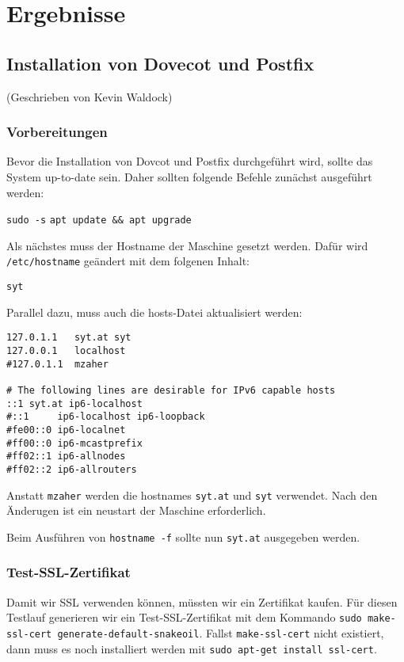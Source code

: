 
\section{Ergebnisse}
\label{sec:Ergebnisse}

\subsection{Installation von Dovecot und Postfix}
(Geschrieben von Kevin Waldock)

\subsubsection{Vorbereitungen}
Bevor die Installation von Dovcot und Postfix durchgeführt wird, sollte das System up-to-date sein.
Daher sollten folgende Befehle zunächst ausgeführt werden:

\verb|sudo -s|\newline
\verb|apt update && apt upgrade|

Als nächstes muss der Hostname der Maschine gesetzt werden. Dafür wird \verb|/etc/hostname| geändert mit dem folgenen Inhalt:

\verb|syt|

Parallel dazu, muss auch die hosts-Datei aktualisiert werden:
\begin{lstlisting}[escapechar=@]
127.0.1.1	syt.at syt
127.0.0.1	localhost
#127.0.1.1	mzaher

# The following lines are desirable for IPv6 capable hosts
::1 syt.at ip6-localhost 
#::1     ip6-localhost ip6-loopback
#fe00::0 ip6-localnet
#ff00::0 ip6-mcastprefix
#ff02::1 ip6-allnodes
#ff02::2 ip6-allrouters
\end{lstlisting}

Anstatt \verb|mzaher| werden die hostnames \verb|syt.at| und \verb|syt| verwendet. Nach den Änderugen ist ein neustart der Maschine erforderlich.

Beim Ausführen von \verb|hostname -f| sollte nun \verb|syt.at| ausgegeben werden.

\subsubsection{Test-SSL-Zertifikat}
Damit wir SSL verwenden können, müssten wir ein Zertifikat kaufen. Für diesen Testlauf generieren wir ein Test-SSL-Zertifikat mit dem Kommando \verb|sudo make-ssl-cert generate-default-snakeoil|. Fallst \verb|make-ssl-cert| nicht existiert, dann muss es noch installiert werden mit \newline\verb|sudo apt-get install ssl-cert|.

